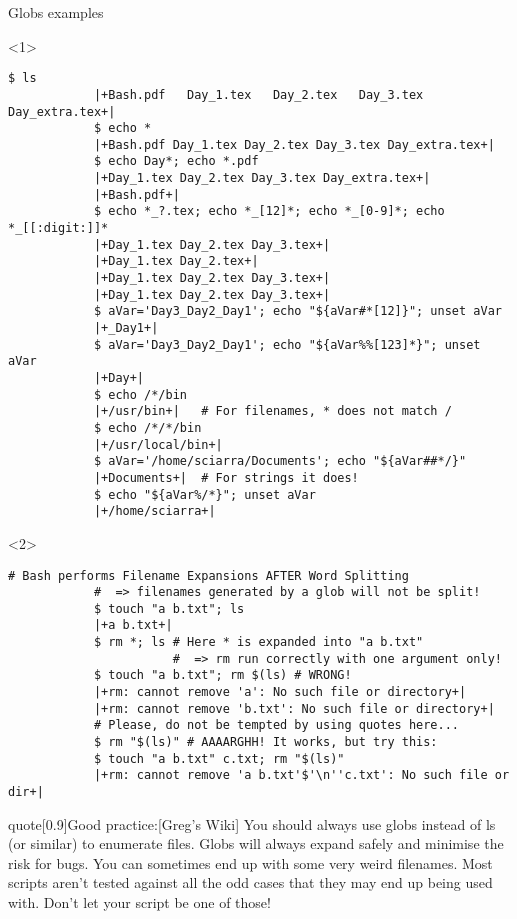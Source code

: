 \begin{frame}[fragile]{Globs examples}
    \vspace{-5mm}
    \begin{onlyenv}<1>
        \begin{lstlisting}[style=MyBash, style=oddnumbers, xleftmargin=1mm, xrightmargin=1mm]
            $ ls
            |+Bash.pdf   Day_1.tex   Day_2.tex   Day_3.tex   Day_extra.tex+|
            $ echo *
            |+Bash.pdf Day_1.tex Day_2.tex Day_3.tex Day_extra.tex+|
            $ echo Day*; echo *.pdf
            |+Day_1.tex Day_2.tex Day_3.tex Day_extra.tex+|
            |+Bash.pdf+|
            $ echo *_?.tex; echo *_[12]*; echo *_[0-9]*; echo *_[[:digit:]]*
            |+Day_1.tex Day_2.tex Day_3.tex+|
            |+Day_1.tex Day_2.tex+|
            |+Day_1.tex Day_2.tex Day_3.tex+|
            |+Day_1.tex Day_2.tex Day_3.tex+|
            $ aVar='Day3_Day2_Day1'; echo "${aVar#*[12]}"; unset aVar
            |+_Day1+|
            $ aVar='Day3_Day2_Day1'; echo "${aVar%%[123]*}"; unset aVar
            |+Day+|
            $ echo /*/bin
            |+/usr/bin+|   # For filenames, * does not match /
            $ echo /*/*/bin
            |+/usr/local/bin+|
            $ aVar='/home/sciarra/Documents'; echo "${aVar##*/}"
            |+Documents+|  # For strings it does!
            $ echo "${aVar%/*}"; unset aVar
            |+/home/sciarra+|
        \end{lstlisting}
    \end{onlyenv}
    \begin{onlyenv}<2>
        \begin{lstlisting}[style=MyBash, style=oddnumbers, xleftmargin=1mm, xrightmargin=1mm, firstnumber=24]
            # Bash performs Filename Expansions AFTER Word Splitting
            #  => filenames generated by a glob will not be split!
            $ touch "a b.txt"; ls
            |+a b.txt+|
            $ rm *; ls # Here * is expanded into "a b.txt"
                       #  => rm run correctly with one argument only!
            $ touch "a b.txt"; rm $(ls) # WRONG!
            |+rm: cannot remove 'a': No such file or directory+|
            |+rm: cannot remove 'b.txt': No such file or directory+|
            # Please, do not be tempted by using quotes here...
            $ rm "$(ls)" # AAAARGHH! It works, but try this:
            $ touch "a b.txt" c.txt; rm "$(ls)"
            |+rm: cannot remove 'a b.txt'$'\n''c.txt': No such file or dir+|
        \end{lstlisting}
        \begin{varblock}{quote}[0.9\textwidth]{Good practice:}[Greg's Wiki]
            You should always use globs instead of ls (or similar) to enumerate files.
            Globs will always expand safely and minimise the risk for bugs.
            You can sometimes end up with some very weird filenames.
            Most scripts aren't tested against all the odd cases that they may end up being used with.
            Don't let your script be one of those!\\[-0.7em] ~
        \end{varblock}
    \end{onlyenv}
\end{frame}
